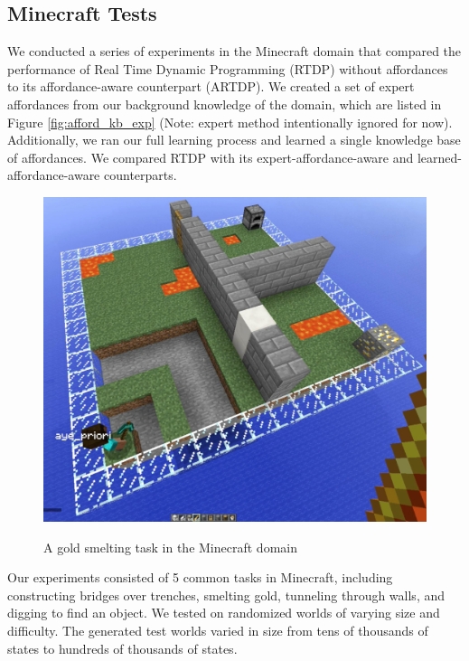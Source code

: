 \documentclass[conference]{IEEEtran}
\begin{document}
\subsection{Minecraft Tests}
We conducted a series of experiments in the Minecraft domain that
compared the performance of Real Time Dynamic Programming (RTDP)
without affordances to its affordance-aware counterpart (ARTDP). We created a set of expert
affordances from our background knowledge of the domain, which are
listed in Figure \ref{fig:afford_kb_exp} (Note: expert method intentionally ignored for now). Additionally, we ran our full
learning process and learned a single knowledge base of affordances. We compared
RTDP with its expert-affordance-aware and learned-affordance-aware 
counterparts. 



\begin{figure}[t]
\centering
  \caption{A gold smelting task in the Minecraft domain}
\includegraphics[scale=0.13]{figures/epicworld_1.jpg}%
  \label{fig:minecraft}
\end{figure}

Our experiments consisted of 5 common tasks in Minecraft, including
constructing bridges over trenches, smelting gold, tunneling
through walls, and digging to find an object.  We tested on 
randomized worlds of varying size and difficulty. The generated test
worlds varied in size from tens of thousands of states to hundreds of thousands of states.
\end{document}

